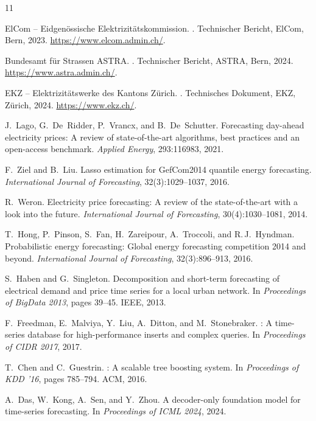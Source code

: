\documentclass[sigconf]{acmart}
\begin{document}

\begin{thebibliography}{11}

ElCom -- Eidgen\"ossische Elektrizit\"atskommission.
.
\newblock Technischer Bericht, ElCom, Bern, 2023.
\newblock \url{https://www.elcom.admin.ch/}.

Bundesamt f\"ur Strassen ASTRA.
.
\newblock Technischer Bericht, ASTRA, Bern, 2024.
\newblock \url{https://www.astra.admin.ch/}.

EKZ -- Elektrizit\"atswerke des Kantons Z\"urich.
.
\newblock Technisches Dokument, EKZ, Z\"urich, 2024.
\newblock \url{https://www.ekz.ch/}.

J.~Lago, G.~De~Ridder, P.~Vrancx, and B.~De~Schutter.
\newblock Forecasting day-ahead electricity prices: A review of
  state-of-the-art algorithms, best practices and an open-access benchmark.
\newblock \emph{Applied Energy}, 293:116983, 2021.

F.~Ziel and B.~Liu.
\newblock Lasso estimation for {GefCom2014} quantile energy forecasting.
\newblock \emph{International Journal of Forecasting}, 32(3):1029--1037, 2016.

R.~Weron.
\newblock Electricity price forecasting: A review of the state-of-the-art with
  a look into the future.
\newblock \emph{International Journal of Forecasting}, 30(4):1030--1081, 2014.

T.~Hong, P.~Pinson, S.~Fan, H.~Zareipour, A.~Troccoli, and R.\,J.~Hyndman.
\newblock Probabilistic energy forecasting: Global energy forecasting
  competition 2014 and beyond.
\newblock \emph{International Journal of Forecasting}, 32(3):896--913, 2016.

S.~Haben and G.~Singleton.
\newblock Decomposition and short-term forecasting of electrical demand and
  price time series for a local urban network.
\newblock In \emph{Proceedings of BigData 2013}, pages 39--45. IEEE, 2013.

F.~Freedman, E.~Malviya, Y.~Liu, A.~Ditton, and M.~Stonebraker.
: A time-series database for high-performance inserts
  and complex queries.
\newblock In \emph{Proceedings of CIDR 2017}, 2017.

T.~Chen and C.~Guestrin.
: A scalable tree boosting system.
\newblock In \emph{Proceedings of KDD '16}, pages 785--794. ACM, 2016.

A.~Das, W.~Kong, A.~Sen, and Y.~Zhou.
\newblock A decoder-only foundation model for time-series forecasting.
\newblock In \emph{Proceedings of ICML 2024}, 2024.

\end{thebibliography}
\end{document}
